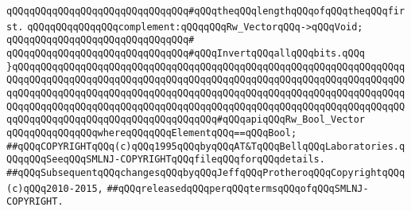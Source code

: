 \verb|qQQqqQQqqQQqqQQqqQQqqQQqqQQqqQQq#qQQqtheqQQqlengthqQQqofqQQqtheqQQqfirst.|\newline
\newline
\verb|qQQqqQQqqQQqqQQqcomplement:qQQqqQQqRw_VectorqQQq->qQQqVoid;|\newline
\verb|qQQqqQQqqQQqqQQqqQQqqQQqqQQqqQQq#|\newline
\verb|qQQqqQQqqQQqqQQqqQQqqQQqqQQqqQQq#qQQqInvertqQQqallqQQqbits.qQQq|\newline
\newline
\verb|}qQQqqQQqqQQqqQQqqQQqqQQqqQQqqQQqqQQqqQQqqQQqqQQqqQQqqQQqqQQqqQQqqQQqqQQqqQQqqQQqqQQqqQQqqQQqqQQqqQQqqQQqqQQqqQQqqQQqqQQqqQQqqQQqqQQqqQQqqQQqqQQqqQQqqQQqqQQqqQQqqQQqqQQqqQQqqQQqqQQqqQQqqQQqqQQqqQQqqQQqqQQqqQQqqQQqqQQqqQQqqQQqqQQqqQQqqQQqqQQqqQQqqQQqqQQqqQQqqQQqqQQqqQQqqQQqqQQqqQQqqQQqqQQqqQQqqQQqqQQqqQQqqQQqqQQqqQQq#qQQqapiqQQqRw_Bool_Vector|\newline
\verb|qQQqqQQqqQQqqQQqwhereqQQqqQQqElementqQQq==qQQqBool;|\newline
\newline
\newline
\verb|##qQQqCOPYRIGHTqQQq(c)qQQq1995qQQqbyqQQqAT&TqQQqBellqQQqLaboratories.qQQqqQQqSeeqQQqSMLNJ-COPYRIGHTqQQqfileqQQqforqQQqdetails.|\newline
\verb|##qQQqSubsequentqQQqchangesqQQqbyqQQqJeffqQQqProtheroqQQqCopyrightqQQq(c)qQQq2010-2015,|\newline
\verb|##qQQqreleasedqQQqperqQQqtermsqQQqofqQQqSMLNJ-COPYRIGHT.|\newline

